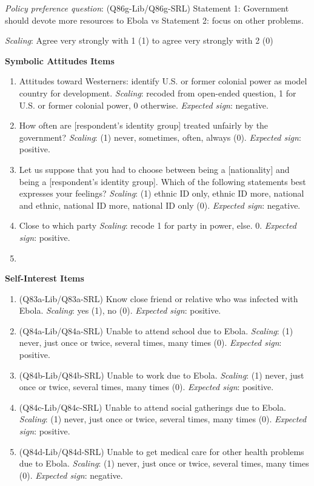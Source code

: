 \documentclass[]{article}
\begin{document}
\textit{Policy preference question}: (Q86g-Lib/Q86g-SRL) Statement 1:
Government should devote more resources to Ebola vs Statement 2: focus
on other problems.

\textit{Scaling}: Agree very strongly with 1 (1) to agree very strongly
with 2 (0)

\textbf{Symbolic Attitudes Items}

\begin{enumerate}
  \item Attitudes toward Westerners: identify U.S. or former colonial power as model country for development. \textit{Scaling}: recoded from open-ended question, 1 for U.S. or former colonial power, 0 otherwise. \textit{Expected sign}: negative.
  \item How often are [respondent’s identity group] treated unfairly by the government? \textit{Scaling}: (1) never, sometimes, often, always (0).  \textit{Expected sign}: positive.
  \item Let us suppose that you had to choose between being a [nationality] and being a [respondent’s identity group]. Which of the following statements best expresses your feelings? \textit{Scaling}: (1) ethnic ID only, ethnic ID more, national and ethnic, national ID more, national ID only (0).  \textit{Expected sign}: negative.
  \item Close to which party \textit{Scaling}: recode 1 for party in power, else.  0. \textit{Expected sign}: positive.
  \item 
\end{enumerate}

\textbf{Self-Interest Items}

\begin{enumerate}
  \item (Q83a-Lib/Q83a-SRL) Know close friend or relative who was infected with Ebola. \textit{Scaling}: yes (1), no (0). \textit{Expected sign}: positive.
  \item (Q84a-Lib/Q84a-SRL) Unable to attend school due to Ebola. \textit{Scaling}: (1) never, just once or twice, several times, many times (0). \textit{Expected sign}: positive.
  \item (Q84b-Lib/Q84b-SRL) Unable to work due to Ebola. \textit{Scaling}: (1) never, just once or twice, several times, many times (0). \textit{Expected sign}: positive.
  \item (Q84c-Lib/Q84c-SRL) Unable to attend social gatherings due to Ebola. \textit{Scaling}: (1) never, just once or twice, several times, many times (0). \textit{Expected sign}: positive.
  \item (Q84d-Lib/Q84d-SRL) Unable to get medical care for other health problems due to Ebola. \textit{Scaling}: (1) never, just once or twice, several times, many times (0). \textit{Expected sign}: negative.
\end{enumerate}
\end{document}
